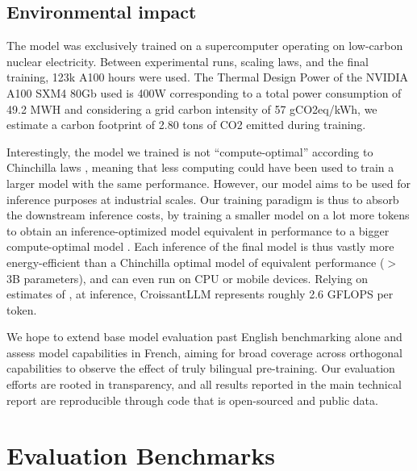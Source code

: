 \subsection{Environmental impact}
The model was exclusively trained on a supercomputer operating on low-carbon nuclear electricity. Between experimental runs, scaling laws, and the final training, 123k A100 hours were used. The Thermal Design Power of the NVIDIA A100 SXM4 80Gb used is 400W corresponding to a total power consumption of 49.2 MWH and considering a grid carbon intensity of 57 gCO2eq/kWh, we estimate a carbon footprint of 2.80 tons of CO2  emitted during training.


Interestingly, the model we trained is not ``compute-optimal'' according to Chinchilla laws , meaning that less computing could have been used to train a larger model with the same performance. However, our model aims to be used for inference purposes at industrial scales. Our training paradigm is thus to absorb the downstream inference costs, by training a smaller model on a lot more tokens to obtain an inference-optimized model equivalent in performance to a bigger compute-optimal model . Each inference of the final model is thus vastly more energy-efficient than a Chinchilla optimal model of equivalent performance ($>$ 3B parameters), and can even run on CPU or mobile devices. Relying on estimates of , at inference, CroissantLLM represents roughly 2.6 GFLOPS per token.

We hope to extend base model evaluation past English benchmarking alone and assess model capabilities in French, aiming for broad coverage across orthogonal capabilities to observe the effect of truly bilingual pre-training. Our evaluation efforts are rooted in transparency, and all results reported in the main technical report are reproducible through code that is open-sourced and public data. 

\section{Evaluation Benchmarks}

